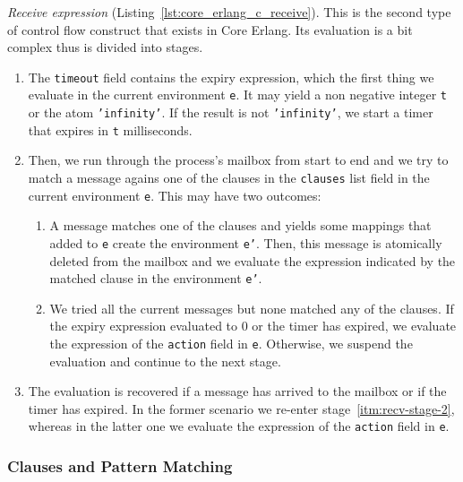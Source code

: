 
\emph{Receive expression} (Listing~\ref{lst:core_erlang_c_receive}).
This is the second type of control flow construct that exists in Core Erlang.
Its evaluation is a bit complex thus is divided into stages.

\begin{enumerate}
  \item The \texttt{timeout} field contains the expiry expression, which the
    first thing we evaluate in the current environment \texttt{e}. It may yield a non
    negative integer \texttt{t} or the atom \texttt{'infinity'}. If the result
    is not \texttt{'infinity'}, we start a timer that expires in \texttt{t}
    milliseconds.
  \item\label{itm:recv-stage-2} Then, we run through the process's mailbox from start to end and we try
    to match a message agains one of the clauses in the \texttt{clauses} list
    field in the current environment \texttt{e}. This may have two outcomes:
    \begin{enumerate}
      \item A message matches one of the clauses and yields some mappings that
        added to \texttt{e} create the environment \texttt{e'}. Then, this
        message is atomically deleted from the mailbox and we evaluate the
        expression indicated by the matched clause in the environment \texttt{e'}.
      \item We tried all the current messages but none matched any of the
        clauses. If the expiry expression evaluated to 0 or the timer has
        expired, we evaluate the expression of the \texttt{action} field in
        \texttt{e}. Otherwise, we suspend the evaluation and continue to the
        next stage.
    \end{enumerate}
  \item The evaluation is recovered if a message has arrived to the mailbox or
    if the timer has expired. In the former scenario we re-enter stage~\ref{itm:recv-stage-2},
    whereas in the latter one we evaluate the expression of the \texttt{action}
    field in \texttt{e}.
\end{enumerate}

\subsubsection{Clauses and Pattern Matching}

